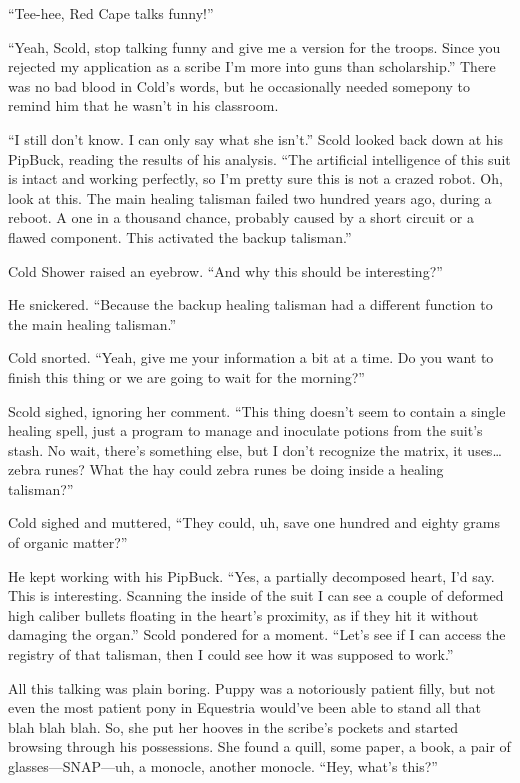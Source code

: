 ``Tee-hee, Red Cape talks funny!''

``Yeah, Scold, stop talking funny and give me a version for the troops. Since you rejected my application as a scribe I'm more into guns than scholarship.'' There was no bad blood in Cold's words, but he occasionally needed somepony to remind him that he wasn't in his classroom.

``I still don't know. I can only say what she isn't.'' Scold looked back down at his PipBuck, reading the results of his analysis. ``The artificial intelligence of this suit is intact and working perfectly, so I'm pretty sure this is not a crazed robot. Oh, look at this. The main healing talisman failed two hundred years ago, during a reboot. A one in a thousand chance, probably caused by a short circuit or a flawed component. This activated the backup talisman.''

Cold Shower raised an eyebrow. ``And why this should be interesting?''

He snickered. ``Because the backup healing talisman had a different function to the main healing talisman.''

Cold snorted. ``Yeah, give me your information a bit at a time. Do you want to finish this thing or we are going to wait for the morning?''

Scold sighed, ignoring her comment. ``This thing doesn't seem to contain a single healing spell, just a program to manage and inoculate potions from the suit's stash. No wait, there's something else, but I don't recognize the matrix, it uses\dots zebra runes? What the hay could zebra runes be doing inside a healing talisman?''

Cold sighed and muttered, ``They could, uh, save one hundred and eighty grams of organic matter?''

He kept working with his PipBuck. ``Yes, a partially decomposed heart, I'd say. This is interesting. Scanning the inside of the suit I can see a couple of deformed high caliber bullets floating in the heart's proximity, as if they hit it without damaging the organ.'' Scold pondered for a moment. ``Let's see if I can access the registry of that talisman, then I could see how it was supposed to work.''

All this talking was plain boring. Puppy was a notoriously patient filly, but not even the most patient pony in Equestria would've been able to stand all that blah blah blah. So, she put her hooves in the scribe's pockets and started browsing through his possessions. She found a quill, some paper, a book, a pair of glasses---SNAP---uh, a monocle, another monocle. ``Hey, what's this?''

